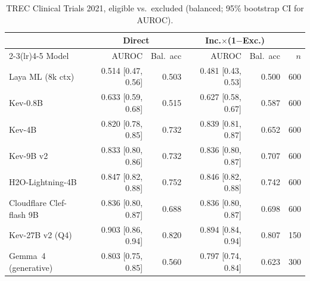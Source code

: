 \begin{table}[t]\centering\small
\caption{TREC Clinical Trials 2021, eligible vs.\ excluded (balanced; 95\% bootstrap CI for AUROC).}\label{tab:trec}
\begin{tabular}{lrrrrr}\toprule & \multicolumn{2}{c}{Direct} & \multicolumn{2}{c}{Inc.$\times$(1$-$Exc.)} & \\ \cmidrule(lr){2-3}\cmidrule(lr){4-5}
Model & AUROC & Bal.\ acc & AUROC & Bal.\ acc & $n$ \\ \midrule
Laya ML (8k ctx) & 0.514 [0.47, 0.56] & 0.503 & 0.481 [0.43, 0.53] & 0.500 & 600 \\
Kev-0.8B & 0.633 [0.59, 0.68] & 0.515 & 0.627 [0.58, 0.67] & 0.587 & 600 \\
Kev-4B & 0.820 [0.78, 0.85] & 0.732 & 0.839 [0.81, 0.87] & 0.652 & 600 \\
Kev-9B v2 & 0.833 [0.80, 0.86] & 0.732 & 0.836 [0.80, 0.87] & 0.707 & 600 \\
H2O-Lightning-4B & 0.847 [0.82, 0.88] & 0.752 & 0.846 [0.82, 0.88] & 0.742 & 600 \\
Cloudflare Clef-flash 9B & 0.836 [0.80, 0.87] & 0.688 & 0.836 [0.80, 0.87] & 0.698 & 600 \\
Kev-27B v2 (Q4) & 0.903 [0.86, 0.94] & 0.820 & 0.894 [0.84, 0.94] & 0.807 & 150 \\
Gemma~4 (generative) & 0.803 [0.75, 0.85] & 0.560 & 0.797 [0.74, 0.84] & 0.623 & 300 \\
\bottomrule\end{tabular}\end{table}